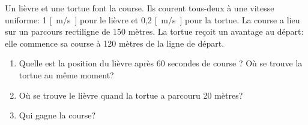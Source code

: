 \begin{exercise}
    Un lièvre et une tortue font la course. Ils courent tous-deux à une vitesse uniforme: 1 \unit{[m/s]} pour le lièvre et 0,2 \unit{[m/s]} pour la tortue. La course a lieu sur un parcours rectiligne de 150 mètres. La tortue reçoit un avantage au départ: elle commence sa course à 120 mètres de la ligne de départ.
    \begin{enumerate}[label=\alph*)]
        \item Quelle est la position du lièvre après 60 secondes de course ? Où se trouve la tortue au même moment?
        \item Où se trouve le lièvre quand la tortue a parcouru 20 mètres?
        \item Qui gagne la course?
    \end{enumerate}
\end{exercise}
\begin{exercise}
\end{exercise}
